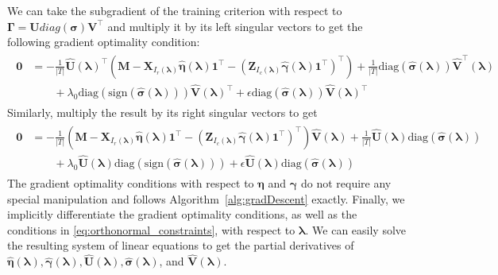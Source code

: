 \documentclass[12pt,letterpaper]{article}
\begin{document}
We can take the subgradient of the training criterion with respect to $\boldsymbol{\Gamma} = \boldsymbol{U} diag(\boldsymbol{\sigma}) \boldsymbol{V}^\top$ and multiply it by its left singular vectors to get the following gradient optimality condition:
\begin{align}
\begin{split}
\boldsymbol{0} & = 
- \frac{1}{|T|} 
\hat{\boldsymbol{U}}(\boldsymbol{\lambda})^\top
\left (
\boldsymbol{M} 
- \boldsymbol{X}_{I_r(\boldsymbol{\lambda})} \hat{\boldsymbol{\eta}}(\boldsymbol{\lambda}) \boldsymbol{1}^\top 
- (\boldsymbol{Z}_{I_c(\boldsymbol{\lambda})} \hat{\boldsymbol{\gamma}}(\boldsymbol{\lambda})  \boldsymbol{1}^\top )^\top
\right )
+ \frac{1}{|T|} \text{diag}(\hat{\boldsymbol{\sigma}}(\boldsymbol{\lambda})) \hat{\boldsymbol{V}}^\top(\boldsymbol{\lambda})
\\
& \qquad + \lambda_0 \text{diag}(\text{sign}(\hat{\boldsymbol{\sigma}}(\boldsymbol{\lambda}))) \hat{\boldsymbol{V}}(\boldsymbol{\lambda})^\top
+ \epsilon \text{diag}(\hat{\boldsymbol{\sigma}}(\boldsymbol{\lambda})) \hat{\boldsymbol{V}}(\boldsymbol{\lambda})^\top
\end{split}
\label{eq:grad_opt_matrix_left}
\end{align}
Similarly, multiply the result by its right singular vectors to get
\begin{align}
\begin{split}
\boldsymbol{0} & = - \frac{1}{|T|} 
\left (
\boldsymbol{M} 
- \boldsymbol{X}_{I_r(\boldsymbol{\lambda})} \hat{\boldsymbol{\eta}}(\boldsymbol{\lambda}) \boldsymbol{1}^\top 
- (\boldsymbol{Z}_{I_c(\boldsymbol{\lambda})} \hat{\boldsymbol{\gamma}}(\boldsymbol{\lambda})  \boldsymbol{1}^\top )^\top
\right )
\hat{\boldsymbol{V}}(\boldsymbol{\lambda})
+ \frac{1}{|T|} 
\hat{\boldsymbol{U}}(\boldsymbol{\lambda})
\text{diag}(\hat{\boldsymbol{\sigma}}(\boldsymbol{\lambda})) 
\\
& \qquad + \lambda_0 \hat{\boldsymbol{U}}(\boldsymbol{\lambda}) \text{diag}(\text{sign}(\hat{\boldsymbol{\sigma}}(\boldsymbol{\lambda})))
+ \epsilon \hat{\boldsymbol{U}}(\boldsymbol{\lambda}) \text{diag}(\hat{\boldsymbol{\sigma}}(\boldsymbol{\lambda}))
\end{split}
\label{eq:grad_opt_matrix_comp}
\end{align}
The gradient optimality conditions with respect to $\boldsymbol{\eta}$ and $\boldsymbol{\gamma}$ do not require any special manipulation and follows Algorithm~\ref{alg:gradDescent} exactly. Finally, we implicitly differentiate the gradient optimality conditions, as well as the conditions in \eqref{eq:orthonormal_constraints}, with respect to $\boldsymbol{\lambda}$. We can easily solve the resulting system of linear equations to get the partial derivatives of 
$\hat{\boldsymbol{\eta}}(\boldsymbol{\lambda}), \hat{\boldsymbol{\gamma}}(\boldsymbol{\lambda}), 
\hat{\boldsymbol{U}}(\boldsymbol{\lambda}), 
\hat{\boldsymbol{\sigma}}(\boldsymbol{\lambda})$, and  
$\hat{\boldsymbol{V}}(\boldsymbol{\lambda})$.
\end{document}
